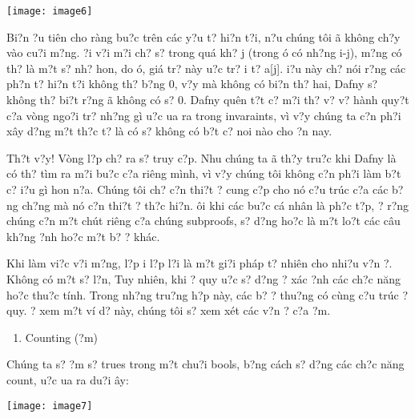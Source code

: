 \documentclass{article} %
\begin{document}
\noindent \texttt{[image: image6]}

Bi?n {\dj}?u ti\^{e}n cho r\`{a}ng bu?c tr\^{e}n c\'{a}c y?u t? hi?n t?i, n?u ch\'{u}ng t\^{o}i {\dj}\~{a} kh\^{o}ng ch?y v\`{a}o cu?i m?ng. {\DJ}?i v?i m?i ch? s? trong qu\'{a} kh? j (trong {\dj}\'{o} c\'{o} nh?ng i-j), m?ng c\'{o} th? l\`{a} m?t s? nh? hon, do {\dj}\'{o}, gi\'{a} tr? n\`{a}y {\dj}u?c tr? {\dj}i t? a[j]. {\DJ}i?u n\`{a}y ch? n\'{o}i r?ng c\'{a}c ph?n t? hi?n t?i kh\^{o}ng th? b?ng 0, v?y m\`{a} kh\^{o}ng c\'{o} bi?n th? hai, Dafny s? kh\^{o}ng th? bi?t r?ng {\dj}\~{a} kh\^{o}ng c\'{o} s? 0. Dafny qu\^{e}n t?t c? m?i th? v? v? h\`{a}nh quy?t c?a v\`{o}ng ngo?i tr? nh?ng g\`{i} {\dj}u?c {\dj}ua ra trong invaraints, v\`{i} v?y ch\'{u}ng ta c?n ph?i x\^{a}y d?ng m?t th?c t? l\`{a} c\'{o} s? kh\^{o}ng c\'{o} b?t c? noi n\`{a}o cho {\dj}?n nay.

Th?t v?y! V\`{o}ng l?p ch? ra s? truy c?p. Nhu ch\'{u}ng ta {\dj}\~{a} th?y tru?c khi Dafny l\`{a} c\'{o} th? t\`{i}m ra m?i bu?c c?a ri\^{e}ng m\`{i}nh, v\`{i} v?y ch\'{u}ng t\^{o}i kh\^{o}ng c?n ph?i l\`{a}m b?t c? {\dj}i?u g\`{i} hon n?a. Ch\'{u}ng t\^{o}i ch? c?n thi?t {\dj}? cung c?p cho n\'{o} c?u tr\'{u}c c?a c\'{a}c b?ng ch?ng m\`{a} n\'{o} c?n thi?t {\dj}? th?c hi?n. {\DJ}\^{o}i khi c\'{a}c bu?c c\'{a} nh\^{a}n l\`{a} ph?c t?p, {\dj}? r?ng ch\'{u}ng c?n m?t ch\'{u}t ri\^{e}ng c?a ch\'{u}ng subproofs, s? d?ng ho?c l\`{a} m?t lo?t c\'{a}c c\^{a}u kh?ng {\dj}?nh ho?c m?t b? {\dj}? kh\'{a}c.

Khi l\`{a}m vi?c v?i m?ng, l?p {\dj}i l?p l?i l\`{a} m?t gi?i ph\'{a}p t? nhi\^{e}n cho nhi?u v?n {\dj}?. Kh\^{o}ng c\'{o} m?t s? l?n, Tuy nhi\^{e}n, khi {\dj}? quy {\dj}u?c s? d?ng {\dj}? x\'{a}c {\dj}?nh c\'{a}c ch?c n\u{a}ng ho?c thu?c t\'{i}nh. Trong nh?ng tru?ng h?p n\`{a}y, c\'{a}c b? {\dj}? thu?ng c\'{o} c\`{u}ng c?u tr\'{u}c {\dj}? quy. {\DJ}? xem m?t v\'{i} d? n\`{a}y, ch\'{u}ng t\^{o}i s? xem x\'{e}t c\'{a}c v?n {\dj}? c?a {\dj}?m.

\begin{enumerate}
\item  Counting ({\DJ}?m)
\end{enumerate}

Ch\'{u}ng ta s? {\dj}?m s? trues trong m?t chu?i bools, b?ng c\'{a}ch s? d?ng c\'{a}c ch?c n\u{a}ng count, {\dj}u?c {\dj}ua ra du?i {\dj}\^{a}y:

\noindent \texttt{[image: image7]}
\end{document}
